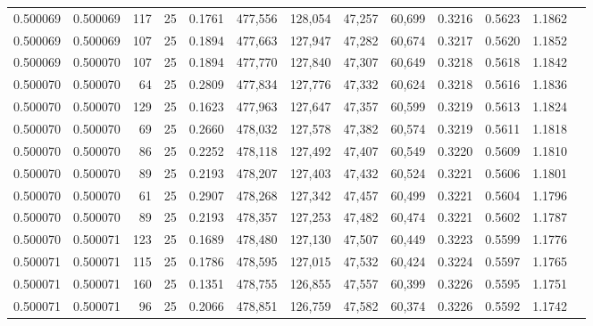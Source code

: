\begin{tabular}{rrrrrrrrrrrrr}
0.500069 & 0.500069 &   117 &  25 &                                     0.1761 & 477,556 & 128,054 &  47,257 &  60,699 & 0.3216 & 0.5623 & 1.1862 \\
0.500069 & 0.500069 &   107 &  25 &                                     0.1894 & 477,663 & 127,947 &  47,282 &  60,674 & 0.3217 & 0.5620 & 1.1852 \\
0.500069 & 0.500070 &   107 &  25 &                                     0.1894 & 477,770 & 127,840 &  47,307 &  60,649 & 0.3218 & 0.5618 & 1.1842 \\
0.500070 & 0.500070 &    64 &  25 &                                     0.2809 & 477,834 & 127,776 &  47,332 &  60,624 & 0.3218 & 0.5616 & 1.1836 \\
0.500070 & 0.500070 &   129 &  25 &                                     0.1623 & 477,963 & 127,647 &  47,357 &  60,599 & 0.3219 & 0.5613 & 1.1824 \\
0.500070 & 0.500070 &    69 &  25 &                                     0.2660 & 478,032 & 127,578 &  47,382 &  60,574 & 0.3219 & 0.5611 & 1.1818 \\
0.500070 & 0.500070 &    86 &  25 &                                     0.2252 & 478,118 & 127,492 &  47,407 &  60,549 & 0.3220 & 0.5609 & 1.1810 \\
0.500070 & 0.500070 &    89 &  25 &                                     0.2193 & 478,207 & 127,403 &  47,432 &  60,524 & 0.3221 & 0.5606 & 1.1801 \\
0.500070 & 0.500070 &    61 &  25 &                                     0.2907 & 478,268 & 127,342 &  47,457 &  60,499 & 0.3221 & 0.5604 & 1.1796 \\
0.500070 & 0.500070 &    89 &  25 &                                     0.2193 & 478,357 & 127,253 &  47,482 &  60,474 & 0.3221 & 0.5602 & 1.1787 \\
0.500070 & 0.500071 &   123 &  25 &                                     0.1689 & 478,480 & 127,130 &  47,507 &  60,449 & 0.3223 & 0.5599 & 1.1776 \\
0.500071 & 0.500071 &   115 &  25 &                                     0.1786 & 478,595 & 127,015 &  47,532 &  60,424 & 0.3224 & 0.5597 & 1.1765 \\
0.500071 & 0.500071 &   160 &  25 &                                     0.1351 & 478,755 & 126,855 &  47,557 &  60,399 & 0.3226 & 0.5595 & 1.1751 \\
0.500071 & 0.500071 &    96 &  25 &                                     0.2066 & 478,851 & 126,759 &  47,582 &  60,374 & 0.3226 & 0.5592 & 1.1742 \\

\end{tabular}

